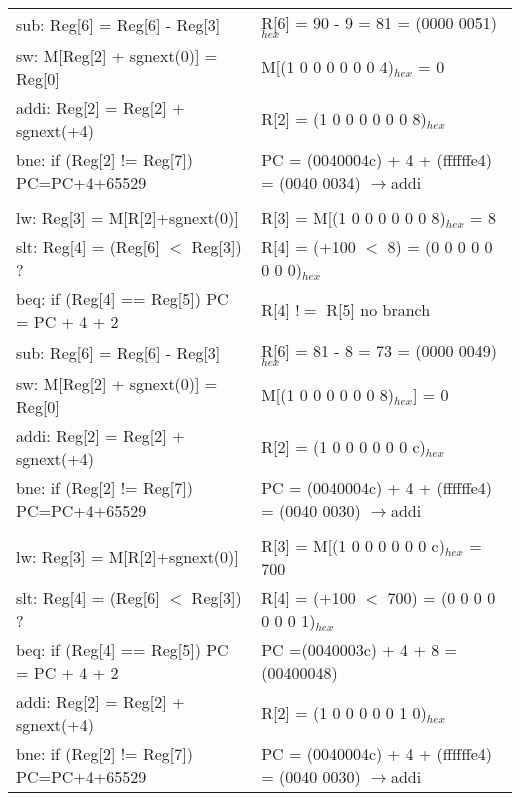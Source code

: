 \documentclass[11pt]{article}   	%
\begin{document}
\begin{table}[!htbp]
\begin{tabular}{ll}
sub: Reg[6] = Reg[6] - Reg[3]& R[6] = 90 - 9 = 81 = (0000 0051)$_{hex}$\\

sw: M[Reg[2] + sgnext(0)] = Reg[0]& M[(1 0 0 0 0 0 0 4)$_{hex}$ = 0\\

addi: Reg[2] = Reg[2] + sgnext(+4) & R[2] = (1 0 0 0 0 0 0 8)$_{hex}$\\

bne: if (Reg[2] != Reg[7]) PC=PC+4+65529 & PC = (0040004c) + 4 + (ffffffe4) = (0040 0034)  $\rightarrow$addi\\


&\\

lw: Reg[3] = M[R[2]+sgnext(0)]&  R[3] = M[(1 0 0 0 0 0 0 8)$_{hex}$ = 8 \\

slt: Reg[4] = (Reg[6] $<$ Reg[3]) ?& R[4] = (+100 $<$ 8) = (0 0 0 0 0 0 0 0)$_{hex}$\\

beq: if (Reg[4] == Reg[5]) PC = PC + 4 + 2& R[4] $!=$ R[5]  no branch\\

sub: Reg[6] = Reg[6] - Reg[3]& R[6] = 81 - 8 = 73 = (0000 0049)$_{hex}$\\

sw: M[Reg[2] + sgnext(0)] = Reg[0]& M[(1 0 0 0 0 0 0 8)$_{hex}$] = 0\\

addi: Reg[2] = Reg[2] + sgnext(+4) & R[2] = (1 0 0 0 0 0 0 c)$_{hex}$\\

bne: if (Reg[2] != Reg[7]) PC=PC+4+65529 & PC = (0040004c) + 4 + (ffffffe4) = (0040 0030)  $\rightarrow$addi\\


&\\

lw: Reg[3] = M[R[2]+sgnext(0)]&  R[3] = M[(1 0 0 0 0 0 0 c)$_{hex}$ = 700 \\

slt: Reg[4] = (Reg[6] $<$ Reg[3]) ?& R[4] = (+100 $<$ 700) = (0 0 0 0 0 0 0 1)$_{hex}$\\

beq: if (Reg[4] == Reg[5]) PC = PC + 4 + 2&  PC =(0040003c) + 4 + 8 = (00400048)  \\

addi: Reg[2] = Reg[2] + sgnext(+4) & R[2] = (1 0 0 0 0 0 1 0)$_{hex}$\\

bne: if (Reg[2] != Reg[7]) PC=PC+4+65529 & PC = (0040004c) + 4 + (ffffffe4) = (0040 0030)  $\rightarrow$addi\\



\end{tabular}
\end{table}
\end{document}
